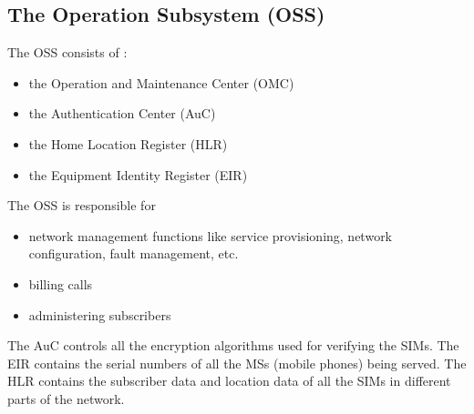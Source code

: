 \subsection{The Operation Subsystem (OSS)}

The OSS consists of :
\begin{itemize}[noitemsep,topsep=0pt,parsep=0pt,partopsep=0pt]
\item the Operation and Maintenance Center (OMC)
\item the Authentication Center (AuC)
\item the Home Location Register (HLR)
\item the Equipment Identity Register (EIR)
\end{itemize}

The OSS is responsible for
\begin{itemize}[noitemsep,topsep=0pt,parsep=0pt,partopsep=0pt]
\item network management functions like service provisioning, network configuration, fault management, etc.
\item billing calls
\item administering subscribers
\end{itemize}

The AuC controls all the encryption algorithms used for verifying the SIMs. The EIR contains the serial numbers of all the MSs (mobile phones) being served. The HLR contains the subscriber data and location data of all the SIMs in different parts of the network.

% 



